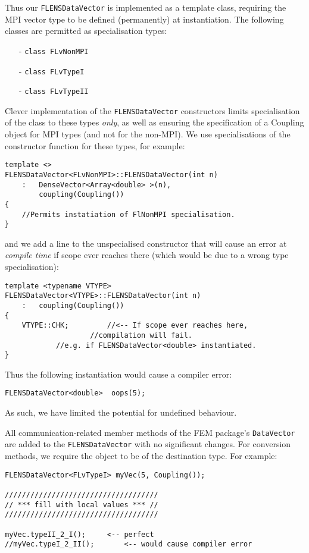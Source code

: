 Thus our \texttt{FLENSDataVector} is implemented as a template class, requiring the MPI vector type to be defined (permanently) at instantiation. The following classes are permitted as specialisation types:
\begin{itemize}
   \item[-] \texttt{class FLvNonMPI}
   \item[-] \texttt{class FLvTypeI}
   \item[-] \texttt{class FLvTypeII}
\end{itemize}

Clever implementation of the \texttt{FLENSDataVector} constructors limits specialisation of the class to these types \emph{only}, as well as ensuring the specification of a Coupling object for MPI types (and not for the non-MPI). We use specialisations of the constructor function for these types, for example:
\begin{lstlisting}
template <>
FLENSDataVector<FLvNonMPI>::FLENSDataVector(int n)
	: 	DenseVector<Array<double> >(n),
		coupling(Coupling())
{
	//Permits instatiation of FlNonMPI specialisation.
}
\end{lstlisting}

and we add a line to the unspecialised constructor that will cause an error at \emph{compile time} if scope ever reaches there (which would be due to a wrong type specialisation):
\begin{lstlisting}
template <typename VTYPE>
FLENSDataVector<VTYPE>::FLENSDataVector(int n)
	:	coupling(Coupling())
{
	VTYPE::CHK;			//<-- If scope ever reaches here,
					//compilation will fail.
			//e.g. if FLENSDataVector<double> instantiated.
}
\end{lstlisting} 

Thus the following instantiation would cause a compiler error:
\begin{lstlisting}
FLENSDataVector<double>  oops(5);
\end{lstlisting}

As such, we have limited the potential for undefined behaviour. 

All communication-related member methods of the FEM package's \texttt{DataVector} are added to the \texttt{FLENSDataVector} with no significant changes. For conversion methods, we require the object to be of the destination type. For example:
\begin{lstlisting}
FLENSDataVector<FLvTypeI> myVec(5, Coupling());

////////////////////////////////////
// *** fill with local values *** //
////////////////////////////////////

myVec.typeII_2_I();		<-- perfect
//myVec.typeI_2_II();		<-- would cause compiler error
\end{lstlisting}


